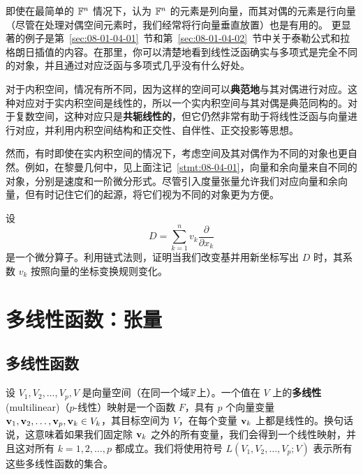 即使在最简单的 $\mathbb{F}^n$ 情况下，认为 $\mathbb{F}^n$ 的元素是列向量，而其对偶的元素是行向量（尽管在处理对偶空间元素时，我们经常将行向量垂直放置）也是有用的。
更显著的例子是第~\ref{sec:08-01-04-01}~节和第~\ref{sec:08-01-04-02}~节中关于泰勒公式和拉格朗日插值的内容。在那里，你可以清楚地看到线性泛函确实与多项式是完全不同的对象，并且通过对应泛函与多项式几乎没有什么好处。

对于内积空间，情况有所不同，因为这样的空间可以\textbf{典范地}与其对偶进行对应。这种对应对于实内积空间是线性的，所以一个实内积空间与其对偶是典范同构的。对于复数空间，这种对应只是\textbf{共轭线性的}，但它仍然非常有助于将线性泛函与向量进行对应，并利用内积空间结构和正交性、自伴性、正交投影等思想。

然而，有时即使在实内积空间的情况下，考虑空间及其对偶作为不同的对象也更自然。例如，在黎曼几何中，见上面注记~\ref{stmt:08-04-01}，向量和余向量来自不同的对象，分别是速度和一阶微分形式。尽管引入度量张量允许我们对应向量和余向量，但有时记住它们的起源，将它们视为不同的对象更为方便。

\begin{problemset}
\item \label{ex:08-04-01} 设
$$D = \sum_{k=1}^n v_k \frac{\partial}{\partial x_k}$$
是一个微分算子。利用链式法则，证明当我们改变基并用新坐标写出 $D$ 时，其系数 $v_k$ 按照向量的坐标变换规则变化。
\end{problemset}

\section{多线性函数：张量}\label{sec:08-05}

\subsection{多线性函数}\label{sec:08-05-01}

\begin{definition}\label{stmt:08-05-01}
设 $V_1, V_2, \dots, V_p, V$ 是向量空间（在同一个域$\mathbb{F}$上）。一个值在 $V$ 上的\textbf{多线性}(multilinear)（$p$-线性）映射是一个函数 $F$，具有 $p$ 个向量变量 $\mathbf{v}_1, \mathbf{v}_2, \dots, \mathbf{v}_p, \mathbf{v}_k \in V_k$，其目标空间为 $V$，在每个变量 $\mathbf{v}_k$ 上都是线性的。换句话说，这意味着如果我们固定除 $\mathbf{v}_k$ 之外的所有变量，我们会得到一个线性映射，并且这对所有 $k = 1, 2, \dots, p$ 都成立。我们将使用符号 $L(V_1, V_2, \dots, V_p; V)$ 表示所有这些多线性函数的集合。
\end{definition}

